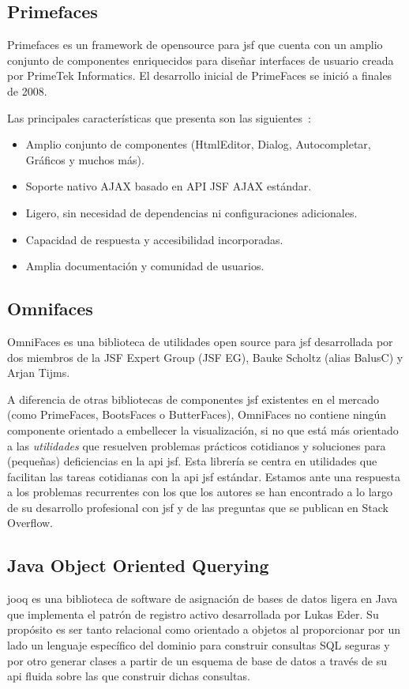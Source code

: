 \subsection{Primefaces}
\label{sec:primefaces}

Primefaces es un framework de \gls{opensource} para \acrshort{jsf} que cuenta con un amplio conjunto de componentes enriquecidos para diseñar interfaces de usuario creada por PrimeTek Informatics. El desarrollo inicial de PrimeFaces se inició a finales de 2008.

Las principales características que presenta son las siguientes~\cite{Primefaces}:
\begin{itemize}
\item Amplio conjunto de componentes (HtmlEditor, Dialog, Autocompletar, Gráficos y muchos más).
\item Soporte nativo AJAX basado en API JSF AJAX estándar. 
\item Ligero, sin necesidad de dependencias ni configuraciones adicionales. 
\item Capacidad de respuesta y accesibilidad incorporadas. 
\item Amplia documentación y comunidad de usuarios.
\end{itemize}


\subsection{Omnifaces}
\label{sec:omnifaces}

OmniFaces es una biblioteca de utilidades open source para \acrshort{jsf} desarrollada por dos miembros de la JSF Expert Group (JSF EG), Bauke Scholtz (alias BalusC) y Arjan Tijms.

A diferencia de otras bibliotecas de componentes \acrshort{jsf}  existentes en el mercado (como PrimeFaces, BootsFaces o ButterFaces), OmniFaces no contiene ningún componente orientado a embellecer la visualización, si no que está más orientado a las \textit{utilidades} que resuelven problemas prácticos cotidianos y soluciones para (pequeñas) deficiencias en la \acrshort{api}  \acrshort{jsf}. Esta librería se centra en utilidades que facilitan las tareas cotidianas con la \acrshort{api} \acrshort{jsf} estándar. Estamos ante una respuesta a los problemas recurrentes con los que los autores se han encontrado a lo largo de su desarrollo profesional con \acrshort{jsf} y de las preguntas que se publican en Stack Overflow.

\subsection{Java Object Oriented Querying}
\label{sec:jooq}
\acrfull{jooq} es una biblioteca de software de asignación de bases de datos ligera en Java que implementa el patrón de registro activo desarrollada por Lukas Eder. Su propósito es ser tanto relacional como orientado a objetos al proporcionar por un lado un lenguaje específico del dominio para construir consultas SQL seguras y por otro generar clases a partir de un esquema de base de datos a través de su \acrshort{api} fluida sobre las que construir dichas consultas.

